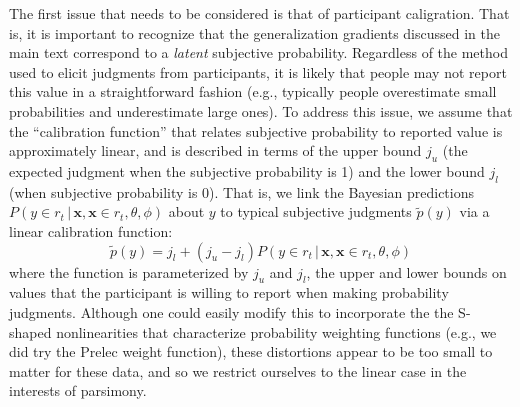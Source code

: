 \documentclass[doc]{apa6}
\newcommand{\p}{P}
\newcommand{\xn}{{\bm{x}}}
\newcommand{\rt}{{r_t}}
\newcommand{\condon}{\, | \,}
\begin{document}
The first issue that needs to be considered is that of participant caligration. That is, it is important to recognize that the generalization gradients discussed in the main text correspond to a {\it latent} subjective probability. Regardless of the method used to elicit judgments from participants, it is likely that people may not report this value in a straightforward fashion (e.g., typically people overestimate small probabilities and underestimate large ones). To address this issue, we assume that the ``calibration function'' that relates subjective probability to reported value is approximately linear, and is described in terms of the upper bound $j_u$ (the expected judgment when the subjective probability is 1) and the lower bound $j_l$ (when subjective probability is 0). That is, we link the Bayesian predictions $\p(y \in \rt \condon  \xn, \xn \in \rt, \theta, \phi)$ about $y$ to typical subjective judgments $\tilde{p}(y)$ via a linear calibration function:
\begin{equation}
\tilde{p}(y) = j_l + (j_u-j_l) \p(y \in \rt \condon  \xn, \xn \in \rt, \theta, \phi)
\end{equation}
where the function is parameterized by $j_u$ and $j_l$, the upper and lower bounds on values that the participant is willing to report when making probability judgments. Although one could easily modify this to incorporate the the S-shaped nonlinearities that characterize probability weighting functions (e.g., we did try the Prelec weight function), these distortions appear to be too small to matter for these data, and so we restrict ourselves to the linear case in the interests of parsimony.
\end{document}
